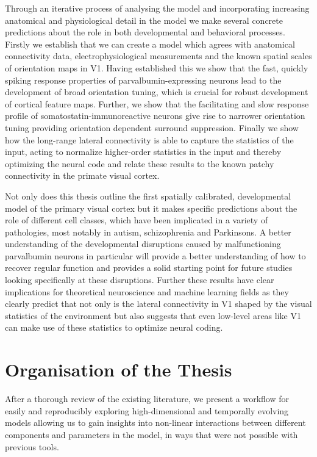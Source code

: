 Through an iterative process of analysing the model and incorporating
increasing anatomical and physiological detail in the model we make
several concrete predictions about the role in both developmental and
behavioral processes. Firstly we establish that we can create a model
which agrees with anatomical connectivity data, electrophysiological
measurements and the known spatial scales of orientation maps in V1.
Having established this we show that the fast, quickly spiking response
properties of parvalbumin-expressing neurons lead to the development
of broad orientation tuning, which is crucial for robust development
of cortical feature maps. Further, we show that the facilitating and
slow response profile of somatostatin-immunoreactive neurons give rise
to narrower orientation tuning providing orientation dependent
surround suppression. Finally we show how the long-range lateral
connectivity is able to capture the statistics of the input, acting to
normalize higher-order statistics in the input and thereby optimizing
the neural code and relate these results to the known patchy
connectivity in the primate visual cortex.

Not only does this thesis outline the first spatially calibrated,
developmental model of the primary visual cortex but it makes specific
predictions about the role of different cell classes, which have been
implicated in a variety of pathologies, most notably in autism,
schizophrenia and Parkinsons. A better understanding of the
developmental disruptions caused by malfunctioning parvalbumin neurons
in particular will provide a better understanding of how to recover
regular function and provides a solid starting point for future
studies looking specifically at these disruptions. Further these
results have clear implications for theoretical neuroscience and
machine learning fields as they clearly predict that not only is the
lateral connectivity in V1 shaped by the visual statistics of the
environment but also suggests that even low-level areas like V1 can
make use of these statistics to optimize neural coding.

\section{Organisation of the Thesis}

After a thorough review of the existing literature, we present a
workflow for easily and reproducibly exploring high-dimensional and
temporally evolving models allowing us to gain insights into
non-linear interactions between different components and parameters in
the model, in ways that were not possible with previous tools.

